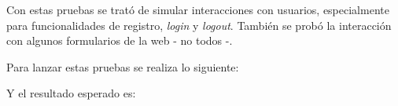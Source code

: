 Con estas pruebas se trató de simular interacciones con usuarios, especialmente para funcionalidades de registro, \emph{login} y \emph{logout}. También se probó la interacción con algunos formularios de la web - no todos -. 

Para lanzar estas pruebas se realiza lo siguiente:


Y el resultado esperado es:

